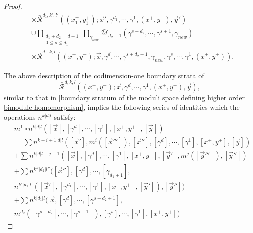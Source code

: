 \documentclass{amsart}
\numberwithin{equation}{section}
\numberwithin{figure}{section}
\begin{document}
\begin{proof}
\begin{equation}
\begin{split}
& \times \bar{\mathcal{R}}^{d_{1}, k', l'}((x^{+}_{1}, y^{+}_{1}); \vec{x}', \gamma^{d_{1}}, \cdots, \gamma^{1}, (x^{+}, y^{+}), \vec{y}')\\
&\cup \coprod_{\substack{d_{1}+d_{2}=d+1\\ 0 \le s \le d_{1}}} \coprod_{\gamma_{new}}
\bar{\mathcal{M}}_{d_{2}+1}(\gamma^{s+d_{2}}, \cdots, \gamma^{s+1}, \gamma_{new})\\
&\times \bar{\mathcal{R}}^{d_{1}, k, l}((x^{-}, y^{-}); \vec{x}, \gamma^{d}, \cdots, \gamma^{s+d_{2}+1}, \gamma_{new}, \gamma^{s}, \cdots, \gamma^{1}, (x^{+}, y^{+})).
\end{split}
\end{equation}

	The above description of the codimension-one boundary strata of 
\begin{equation*}
\bar{\mathcal{R}}^{d, k, l}((x^{-}, y^{-}); \vec{x}, \gamma^{d}, \cdots, \gamma^{1}, (x^{+}, y^{+}), \vec{y}),
\end{equation*}
similar to that in \eqref{boundary stratum of the moduli space defining higher order bimodule homomorphism}, implies the following series of identities which the operations $n^{k|d|l}$ satisfy:
\begin{equation}
\begin{split}
&m^{1} \circ n^{k|d|l}([\vec{x}], [\gamma^{d}], \cdots, [\gamma^{1}], [x^{+}, y^{+}], [\vec{y}])\\
&= \sum n^{k-i+1|d|l}([\vec{x}'], m^{i}([\vec{x}''']), [\vec{x}''], [\gamma^{d}], \cdots, [\gamma^{1}], [x^{+}, y^{+}], [\vec{y}])\\
&+ \sum n^{k|d|l-j+1}([\vec{x}], [\gamma^{d}], \cdots, [\gamma^{1}], [x^{+}, y^{+}], [\vec{y}'], m^{j}([\vec{y}''']), [\vec{y}''])\\
&+ \sum n^{k''|d_{2}|l''}([\vec{x}''], [\gamma^{d}], \cdots, [\gamma_{d_{1}+1}],\\
& n^{k'|d_{1}|l'}([\vec{x}'], [\gamma^{d_{1}}], \cdots, [\gamma^{1}], [x^{+}, y^{+}], [\vec{y}']), [\vec{y}''])\\
&+ \sum n^{k|d_{1}|l}([\vec{x}, [\gamma^{d}], \cdots, [\gamma^{s+d_{2}+1}], \\
&m^{d_{2}}([\gamma^{s+d_{2}}], \cdots, [\gamma^{s+1}]), [\gamma^{s}], \cdots, [\gamma^{1}], [x^{+}, y^{+}])
\end{split}
\end{equation}

\end{proof}
\end{document}
